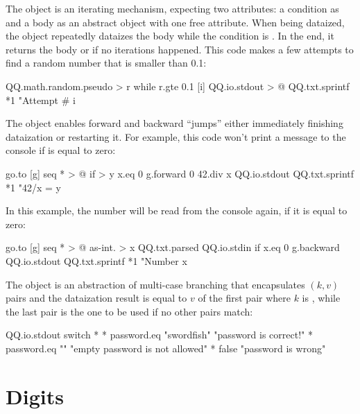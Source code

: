 \documentclass[sigplan,nonacm]{acmart}
\newcommand\aff[1]{\ff{\textcolor{gray}{\(\star\)}#1}}
\newcommand\deff[1]{\ff{\textcolor{blue!50!black}{\textbf{#1}}}}
\newcommand\adeff[1]{\aff{\textcolor{blue!50!black}{\textbf{#1}}}}
\begin{document}
The \adeff{while} object is an iterating mechanism, expecting two attributes: a condition as  and a body as an abstract object with one free attribute.
When being dataized, the object \aff{while} repeatedly dataizes the body while the condition is .
In the end, it returns the body or  if no iterations happened.
This code makes a few attempts to find a random number that is smaller than 0.1:

\begin{ffcode}
QQ.math.random.pseudo > r
while
  r.gte 0.1
  [i]
    QQ.io.stdout > @
      QQ.txt.sprintf *1
        "Attempt #%
        i
\end{ffcode}

The \adeff{go} object enables forward and backward ``jumps'' either immediately finishing dataization or restarting it.
For example, this code won't print a message to the console if  is equal to zero:

\begin{ffcode}
go.to
  [g]
    seq * > @
      if > y
        x.eq 0
        g.forward 0
        42.div x
      QQ.io.stdout
        QQ.txt.sprintf *1
          "42/x = %
          y
\end{ffcode}

In this example, the number will be read from the console again, if it is equal to zero:

\begin{ffcode}
go.to
  [g]
    seq * > @
      as-int. > x
        QQ.txt.parsed
          QQ.io.stdin
      if
        x.eq 0
        g.backward
        QQ.io.stdout
          QQ.txt.sprintf *1
            "Number %
            x
\end{ffcode}

The \deff{switch} object is an abstraction of multi-case branching that encapsulates \((k, v)\) pairs and the dataization result is equal to \(v\) of the first pair where \(k\) is , while the last pair is the one to be used if no other pairs match:

\begin{ffcode}
QQ.io.stdout
  switch *
    *
      password.eq "swordfish"
      "password is correct!"
    *
      password.eq ""
      "empty password is not allowed"
    *
      false
      "password is wrong"
\end{ffcode}

\section{Digits}\label{sec:digits}
\end{document}
